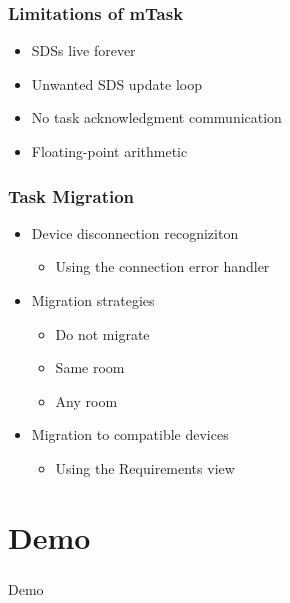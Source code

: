 \documentclass[department=icis, notes={show notes}, slidesperpage=1, official=true,showdate=true,slidenumbers=relative]{beamerruhuisstijl}
\begin{document}
\begin{frame}[fragile]
    \frametitle{Limitations of mTask}
    \begin{itemize}
        \setlength\itemsep{1em}
        \item SDSs live forever
        \item Unwanted SDS update loop
        \item No task acknowledgment communication
        \item Floating-point arithmetic
    \end{itemize}
\end{frame}

\begin{frame}[fragile]
    \frametitle{Task Migration}
    \begin{itemize}
        \setlength\itemsep{1em}
        \item Device disconnection recogniziton
        \begin{itemize}[label=$\diamond$]
            \item Using the connection error handler
        \end{itemize}
        \item Migration strategies
        \begin{itemize}[label=$\diamond$]
            \item Do not migrate
            \item Same room
            \item Any room
        \end{itemize}
        \item Migration to compatible devices
        \begin{itemize}[label=$\diamond$]
            \item Using the Requirements view
        \end{itemize}
    \end{itemize}
\end{frame}

\section{Demo}
\begin{frame}[plain,c]
  \frametitle{}
  \begin{center}
    \Huge Demo
  \end{center}
\end{frame}
\end{document}
